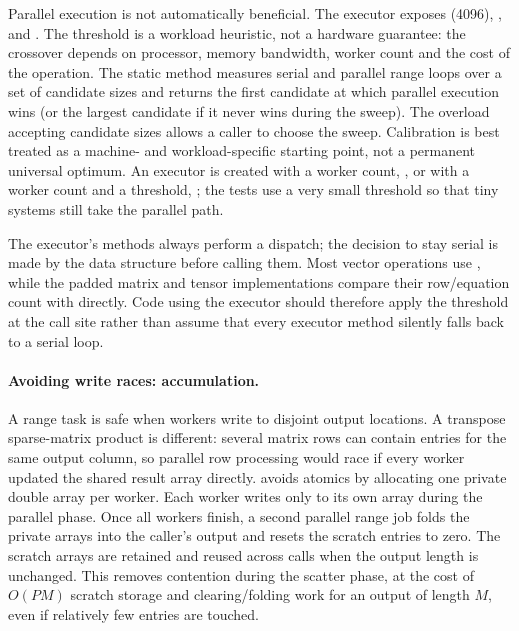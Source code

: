 \documentclass[main.tex]{subfiles}
\begin{document}
    Parallel execution is not automatically beneficial. The executor exposes  (4096), ,  and . The threshold is a workload heuristic, not a hardware guarantee: the crossover depends on processor, memory bandwidth, worker count and the cost of the operation. The static  method measures serial and parallel range loops over a set of candidate sizes and returns the first candidate at which parallel execution wins (or the largest candidate if it never wins during the sweep). The overload accepting candidate sizes allows a caller to choose the sweep. Calibration is best treated as a machine- and workload-specific starting point, not a permanent universal optimum. An executor is created with a worker count, , or with a worker count and a threshold, ; the tests use a very small threshold so that tiny systems still take the parallel path.

    The executor's  methods always perform a dispatch; the decision to stay serial is made by the data structure before calling them. Most vector operations use , while the padded matrix and tensor implementations compare their row/equation count with  directly. Code using the executor should therefore apply the threshold at the call site rather than assume that every executor method silently falls back to a serial loop.

    \paragraph{Avoiding write races: accumulation.}
    A range task is safe when workers write to disjoint output locations. A transpose sparse-matrix product is different: several matrix rows can contain entries for the same output column, so parallel row processing would race if every worker updated the shared result array directly.  avoids atomics by allocating one private double array per worker. Each worker writes only to its own array during the parallel phase. Once all workers finish, a second parallel range job folds the private arrays into the caller's output and resets the scratch entries to zero. The scratch arrays are retained and reused across calls when the output length is unchanged. This removes contention during the scatter phase, at the cost of $O(PM)$ scratch storage and clearing/folding work for an output of length $M$, even if relatively few entries are touched.
\end{document}
